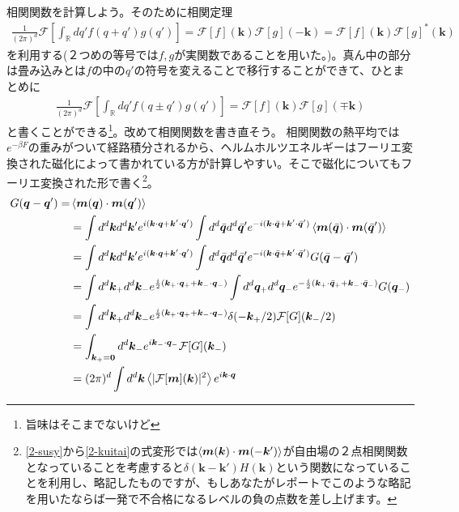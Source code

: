 \documentclass[autodetect-engine,dvipdfmx-if-dvi,ja=standard]{bxjsarticle}
\theoremstyle{break}
\begin{document}
                相関関数を計算しよう。そのために相関定理
                \begin{align}
                    \frac{1}{(2\pi)^d}\mathcal{F}\left[\int_\mathbb{R} dq' f(q+q')g(q')\right]=\mathcal{F}[f](\bm{k})\mathcal{F}[g](-\bm{k})=\mathcal{F}[f](\bm{k})\mathcal{F}[g]^*(\bm{k})
                \end{align}
                を利用する(２つめの等号では$f,g$が実関数であることを用いた。)。真ん中の部分は畳み込みとは$f$の中の$q'$の符号を変えることで移行することができて、ひとまとめに
                \begin{align}
                    \frac{1}{(2\pi)^d}\mathcal{F}\left[\int_\mathbb{R} dq' f(q\pm q')g(q')\right]=\mathcal{F}[f](\bm{k})\mathcal{F}[g](\mp\bm{k})
                \end{align}
                と書くことができる\footnote{旨味はそこまでないけど}。改めて相関関数を書き直そう。
                \fi
                相関関数の熱平均では$e^{-\beta F}$の重みがついて経路積分されるから、ヘルムホルツエネルギーはフーリエ変換された磁化によって書かれている方が計算しやすい。そこで磁化についてもフーリエ変換された形で書く\footnote{\eqref{2-susy}から\eqref{2-kuitai}の式変形では$\braket{\bm{m}(\bm{k})\cdot \bm{m}(-\bm{k}')}$が自由場の２点相関関数となっていることを考慮すると$\delta(\bm{k}-\bm{k}')H(\bm{k})$という関数になっていることを利用し、略記したものですが、もしあなたがレポートでこのような略記を用いたならば一発で不合格になるレベルの負の点数を差し上げます。}。
                    \begin{align}
                        G(\bm{q}-\bm{q}')=&\braket{\bm{m}(\bm{q})\cdot \bm{m}(\bm{q}')}\\
                        &=\int d^d \bm{k}d^d \bm{k}' e^{i(\bm{k}\cdot\bm{q}+\bm{k}'\cdot\bm{q}')}\int d^d \bar{\bm{q}}d^d \bar{\bm{q}}'e^{-i(\bm{k}\cdot\bar{\bm{q}}+\bm{k}'\cdot\bar{\bm{q}}')}\braket{\bm{m}(\bar{\bm{q}})\cdot \bm{m}(\bar{\bm{q}}')}\\
                        &=\int d^d \bm{k}d^d \bm{k}' e^{i(\bm{k}\cdot\bm{q}+\bm{k}'\cdot\bm{q}')}\int d^d \bar{\bm{q}}d^d \bar{\bm{q}}' e^{-i(\bm{k}\cdot\bar{\bm{q}}+\bm{k}'\cdot\bar{\bm{q}}')}G(\bar{\bm{q}}-\bar{\bm{q}}')\\
                        &=\int d^d \bm{k}_+d^d \bm{k}_- e^{\frac{i}{2}(\bm{k}_+ \cdot \bm{q}_+ +\bm{k}_-\cdot \bm{q}_-)}\int d^d \bm{q}_+d^d \bm{q}_- e^{-\frac{i}{2}(\bm{k}_+ \cdot \bar{\bm{q}}_+ +\bm{k}_-\cdot \bar{\bm{q}}_-)}G(\bm{q}_-)\\
                        &=\int d^d \bm{k}_+d^d \bm{k}_- e^{\frac{i}{2}(\bm{k}_+ \cdot \bm{q}_+ +\bm{k}_-\cdot \bm{q}_-)}\delta(-\bm{k}_+/2)\mathcal{F}[G](\bm{k}_- /2)\\
                        &=\int_{\bm{k}_+ =\bm{0}} d^d \bm{k}_- e^{i\bm{k}_- \cdot \bm{q}_-}\mathcal{F}[G](\bm{k}_- )\\
                        &=(2\pi)^d \int d^d\bm{k}\left\langle|\mathcal{F}[\bm{m}](\bm{k})|^2 \right\rangle e^{i\bm{k}\cdot \bm{q}}
                    \end{align}
\end{document}
